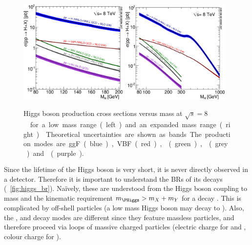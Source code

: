 \begin{figure}
	\includegraphics[width=0.48\textwidth]{tex/motivation/xs_lowrange}
	\hfill
	\includegraphics[width=0.48\textwidth]{tex/motivation/xs_fullrange}
	\caption{Higgs boson production cross sections versus mass at 
	\unit{$\sqrt{s} = 8$}{\TeV} for a low mass range (left) and an expanded mass range 
	(right) \cite{YR2}. Theoretical uncertainties are shown as bands. The production modes
	are ggF (blue), VBF (red), \WH (green), \ZH (grey) and \ttH (purple).}
	\label{fig:higgs_xs}
\end{figure}

Since the lifetime of the Higgs boson is very short, it is never directly observed in a 
detector. Therefore it is important to understand the BRs of its decays 
(\Figure~\ref{fig:higgs_br}). Na\"{i}vely, these are understood from the Higgs boson coupling to mass and the kinematic requirement $m_{\PHiggs} > m_X + m_Y$ for a decay
. This is complicated by off-shell particles (\eg a low mass
Higgs boson may decay to \HepProcess{\PW \PW^{*}}). 
Also, the \HepProcess{\Pphoton \Pphoton}, \HepProcess{\PZ \Pphoton} and 
\HepProcess{\Pgluon \Pgluon} decay modes are different since they feature massless 
particles, and therefore proceed via loops of massive charged particles (electric charge 
for \HepProcess{\Pphoton \Pphoton} and \HepProcess{\PZ \Pphoton}, colour charge for 
\HepProcess{\Pgluon \Pgluon}).

